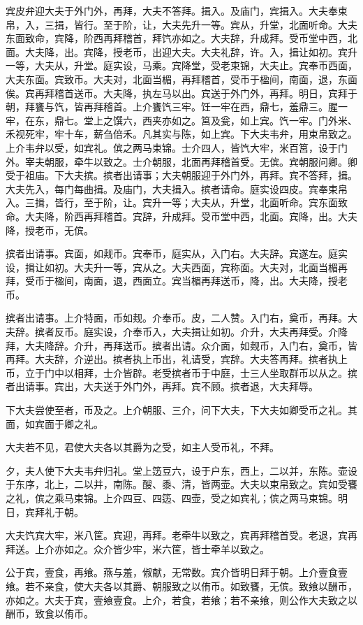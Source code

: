 \documentclass[]{article}
\begin{document}
宾皮弁迎大夫于外门外，再拜，大夫不答拜。揖入。及庙门，宾揖入。大夫奉束帛，入，三揖，皆行。至于阶，让，大夫先升一等。宾从，升堂，北面听命。大夫东面致命，宾降，阶西再拜稽首，拜饩亦如之。大夫辞，升成拜。受币堂中西，北面。大夫降，出。宾降，授老币，出迎大夫。大夫礼辞，许。入，揖让如初。宾升一等，大夫从，升堂。庭实设，马乘。宾降堂，受老束锦，大夫止。宾奉币西面，大夫东面。宾致币。大夫对，北面当楣，再拜稽首，受币于楹间，南面，退，东面俟。宾再拜稽首送币。大夫降，执左马以出。宾送于外门外，再拜。明日，宾拜于朝，拜饔与饩，皆再拜稽首。上介饔饩三牢。饪一牢在西，鼎七，羞鼎三。腥一牢，在东，鼎七。堂上之馔六，西夹亦如之。筥及瓮，如上宾。饩一牢。门外米、禾视死牢，牢十车，薪刍倍禾。凡其实与陈，如上宾。下大夫韦弁，用束帛致之。上介韦弁以受，如宾礼。傧之两马束锦。士介四人，皆饩大牢，米百筥，设于门外。宰夫朝服，牵牛以致之。士介朝服，北面再拜稽首受。无傧。宾朝服问卿。卿受于祖庙。下大夫摈。摈者出请事；大夫朝服迎于外门外，再拜。宾不答拜，揖。大夫先入，每门每曲揖。及庙门，大夫揖入。摈者请命。庭实设四皮。宾奉束帛入。三揖，皆行，至于阶，让。宾升一等；大夫从，升堂，北面听命。宾东面致命。大夫降，阶西再拜稽首。宾辞，升成拜。受币堂中西，北面。宾降，出。大夫降，授老币，无傧。

摈者出请事。宾面，如觌币。宾奉币，庭实从，入门右。大夫辞。宾遂左。庭实设，揖让如初。大夫升一等，宾从之。大夫西面，宾称面。大夫对，北面当楣再拜，受币于楹间，南面，退，西面立。宾当楣再拜送币，降，出。大夫降，授老币。

摈者出请事。上介特面，币如觌。介奉币。皮，二人赞。入门右，奠币，再拜。大夫辞。摈者反币。庭实设，介奉币入，大夫揖让如初。介升，大夫再拜受。介降拜，大夫降辞。介升，再拜送币。摈者出请。众介面，如觌币，入门右，奠币，皆再拜。大夫辞，介逆出。摈者执上币出，礼请受，宾辞。大夫答再拜。摈者执上币，立于门中以相拜，士介皆辟。老受摈者币于中庭，士三人坐取群币以从之。摈者出请事。宾出，大夫送于外门外，再拜。宾不顾。摈者退，大夫拜辱。

下大夫尝使至者，币及之。上介朝服、三介，问下大夫，下大夫如卿受币之礼。其面，如宾面于卿之礼。

大夫若不见，君使大夫各以其爵为之受，如主人受币礼，不拜。

夕，夫人使下大夫韦弁归礼。堂上笾豆六，设于户东，西上，二以并，东陈。壶设于东序，北上，二以并，南陈。醙、黍、清，皆两壶。大夫以束帛致之。宾如受饔之礼，傧之乘马束锦。上介四豆、四笾、四壶，受之如宾礼；傧之两马束锦。明日，宾拜礼于朝。

大夫饩宾大牢，米八筐。宾迎，再拜。老牵牛以致之，宾再拜稽首受。老退，宾再拜送。上介亦如之。众介皆少牢，米六筐，皆士牵羊以致之。

公于宾，壹食，再飨。燕与羞，俶献，无常数。宾介皆明日拜于朝。上介壹食壹飨。若不亲食，使大夫各以其爵、朝服致之以侑币。如致饔，无傧。致飨以酬币，亦如之。大夫于宾，壹飨壹食。上介，若食，若飨；若不亲飨，则公作大夫致之以酬币，致食以侑币。
\end{document}
